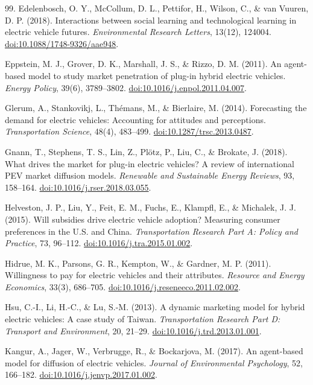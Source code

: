 \documentclass[11pt]{article} %
\begin{document}
\begin{thebibliography}{99.}
Edelenbosch, O. Y., McCollum, D. L., Pettifor, H., Wilson, C., \& van Vuuren, D. P. (2018).
Interactions between social learning and technological learning in electric
vehicle futures.
\emph{Environmental Research Letters}, 13(12), 124004.
\href{https://doi.org/10.1088/1748-9326/aae948}{doi:10.1088/1748-9326/aae948}.

Eppstein, M. J., Grover, D. K., Marshall, J. S., \& Rizzo, D. M. (2011).
An agent-based model to study market penetration of plug-in hybrid electric
vehicles.
\emph{Energy Policy}, 39(6), 3789--3802.
\href{https://doi.org/10.1016/j.enpol.2011.04.007}{doi:10.1016/j.enpol.2011.04.007}.

Glerum, A., Stankovikj, L., Th\'{e}mans, M., \& Bierlaire, M. (2014).
Forecasting the demand for electric vehicles: Accounting for attitudes and
perceptions.
\emph{Transportation Science}, 48(4), 483--499.
\href{https://doi.org/10.1287/trsc.2013.0487}{doi:10.1287/trsc.2013.0487}.

Gnann, T., Stephens, T. S., Lin, Z., Pl\"{o}tz, P., Liu, C., \& Brokate, J. (2018).
What drives the market for plug-in electric vehicles? A review of international
PEV market diffusion models.
\emph{Renewable and Sustainable Energy Reviews}, 93, 158--164.
\href{https://doi.org/10.1016/j.rser.2018.03.055}{doi:10.1016/j.rser.2018.03.055}.

Helveston, J. P., Liu, Y., Feit, E. M., Fuchs, E., Klampfl, E., \& Michalek, J. J. (2015).
Will subsidies drive electric vehicle adoption? Measuring consumer preferences
in the U.S. and China.
\emph{Transportation Research Part A: Policy and Practice}, 73, 96--112.
\href{https://doi.org/10.1016/j.tra.2015.01.002}{doi:10.1016/j.tra.2015.01.002}.

Hidrue, M. K., Parsons, G. R., Kempton, W., \& Gardner, M. P. (2011).
Willingness to pay for electric vehicles and their attributes.
\emph{Resource and Energy Economics}, 33(3), 686--705.
\href{https://doi.org/10.1016/j.reseneeco.2011.02.002}{doi:10.1016/j.reseneeco.2011.02.002}.

Hsu, C.-I., Li, H.-C., \& Lu, S.-M. (2013).
A dynamic marketing model for hybrid electric vehicles: A case study of Taiwan.
\emph{Transportation Research Part D: Transport and Environment}, 20, 21--29.
\href{https://doi.org/10.1016/j.trd.2013.01.001}{doi:10.1016/j.trd.2013.01.001}.

Kangur, A., Jager, W., Verbrugge, R., \& Bockarjova, M. (2017).
An agent-based model for diffusion of electric vehicles.
\emph{Journal of Environmental Psychology}, 52, 166--182.
\href{https://doi.org/10.1016/j.jenvp.2017.01.002}{doi:10.1016/j.jenvp.2017.01.002}.


\end{thebibliography}
\end{document}
